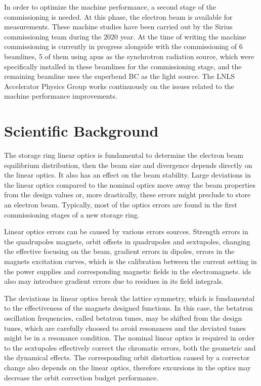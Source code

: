 In order to optimize the machine performance, a second stage of the commissioning is needed. At this phase, the electron beam is available for measurements. These machine studies have been carried out by the Sirius commissioning team during the 2020 year. At the time of writing the machine commissioning is currently in progress alongside with the commissioning of 6 beamlines, 5 of them using \glspl{apu} as the synchrotron radiation source, which were specifically installed in these beamlines for the commissioning stage, and the remaining beamline uses the superbend BC as the light source. The LNLS Accelerator Physics Group works continuously on the issues related to the machine performance improvements. 

\section{Scientific Background}\label{sec:background}
The storage ring linear optics is fundamental to determine the electron beam equilibrium distribution, then the beam size and divergence depends directly on the linear optics. It also has an effect on the beam stability. Large deviations in the linear optics compared to the nominal optics move away the beam properties from the design values or, more drastically, these errors might preclude to store an electron beam. Typically, most of the optics errors are found in the first commissioning stages of a new storage ring.

Linear optics errors can be caused by various errors sources. Strength errors in the quadrupoles magnets, orbit offsets in quadrupoles and sextupoles, changing the effective focusing on the beam, gradient errors in dipoles, errors in the magnets excitation curves, which is the calibration between the current setting in the power supplies and corresponding magnetic fields in the electromagnets. \glspl{id} also may introduce gradient errors due to residues in its field integrals. 

The deviations in linear optics break the lattice symmetry, which is fundamental to the effectiveness of the magnets designed functions. In this case, the betatron oscillation frequencies, called betatron tunes, may be shifted from the design tunes, which are carefully choosed to avoid resonances and the deviated tunes might be in a resonance condition. The nominal linear optics is required in order to the sextupoles effectively correct the chromatic errors, both the geometric and the dynamical effects. The corresponding orbit distortion caused by a corrector change also depends on the linear optics, therefore excursions in the optics may decrease the orbit correction budget performance.

